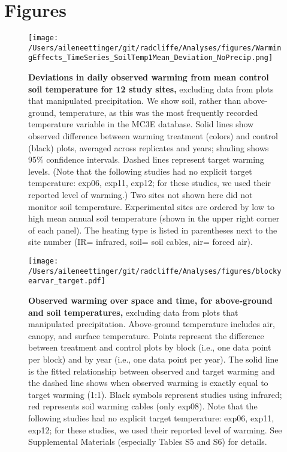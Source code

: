\documentclass{article}
\begin{document}
\section* {Figures}
\clearpage
 \begin{figure}[h]
\centering
 \texttt{[image: /Users/aileneettinger/git/radcliffe/Analyses/figures/WarmingEffects\_TimeSeries\_SoilTemp1Mean\_Deviation\_NoPrecip.png]}
 \caption{\textbf{Deviations in daily observed warming from mean control soil temperature for 12 study sites,} excluding data from plots that manipulated precipitation. We show soil, rather than above-ground, temperature, as this was the most frequently recorded temperature variable in the MC3E database. Solid lines show observed difference between warming treatment (colors) and control (black) plots, averaged across replicates and years; shading shows 95\% confidence intervals. Dashed lines represent target warming levels. (Note that the following studies had no explicit target temperature: exp06, exp11, exp12; for these studies, we used their reported level of warming.) Two sites not shown here did not monitor soil temperature. Experimental sites are ordered by low to high mean annual soil temperature (shown in the upper right corner of each panel). The heating type is listed in parentheses next to the site number (IR= infrared, soil= soil cables, air= forced air).} %
 \label{fig:effwarm}
 \end{figure}
 \begin{figure}[p]
 \centering
 \texttt{[image: /Users/aileneettinger/git/radcliffe/Analyses/figures/blockyearvar\_target.pdf]} 
 \caption{\textbf{Observed warming over space and time, for above-ground and soil temperatures,} excluding data from plots that manipulated precipitation. Above-ground temperature includes air, canopy, and surface temperature. Points represent the difference between treatment and control plots by block (i.e., one data point per block) and by year (i.e., one data point per year). The solid line is the fitted relationship between observed and target warming and the dashed line shows when observed warming is exactly equal to target warming (1:1). Black symbols represent studies using infrared; red represents soil warming cables (only exp08). Note that the following studies had no explicit target temperature: exp06, exp11, exp12; for these studies, we used their reported level of warming. See Supplemental Materials (especially Tables S5 and S6) for details.}
 \label{fig:blockyear}
 \end{figure}
\end{document}
